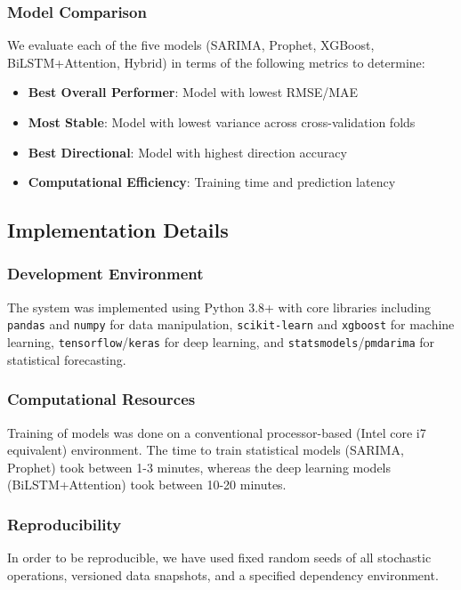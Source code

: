 \subsubsection{Model Comparison}

We evaluate each of the five models (SARIMA, Prophet, XGBoost, BiLSTM+Attention, Hybrid) in terms of the following metrics to determine:
\begin{itemize}
    \item \textbf{Best Overall Performer}: Model with lowest RMSE/MAE
    \item \textbf{Most Stable}: Model with lowest variance across cross-validation folds
    \item \textbf{Best Directional}: Model with highest direction accuracy
    \item \textbf{Computational Efficiency}: Training time and prediction latency
\end{itemize}

\subsection{Implementation Details}

\subsubsection{Development Environment}
The system was implemented using Python 3.8+ with core libraries including \texttt{pandas} and \texttt{numpy} for data manipulation, \texttt{scikit-learn} and \texttt{xgboost} for machine learning, \texttt{tensorflow}/\texttt{keras} for deep learning, and \texttt{statsmodels}/\texttt{pmdarima} for statistical forecasting.

\subsubsection{Computational Resources}
Training of models was done on a conventional processor-based (Intel core i7 equivalent) environment. The time to train statistical models (SARIMA, Prophet) took between 1-3 minutes, whereas the deep learning models (BiLSTM+Attention) took between 10-20 minutes.

\subsubsection{Reproducibility}
In order to be reproducible, we have used fixed random seeds of all stochastic operations, versioned data snapshots, and a specified dependency environment.

